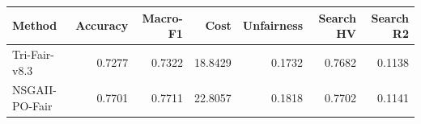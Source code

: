 \begin{tabular}{lrrrrrr}
\hline
Method & Accuracy & Macro-F1 & Cost & Unfairness & Search HV & Search R2 \\
\hline
Tri-Fair-v8.3 & 0.7277 & 0.7322 & 18.8429 & 0.1732 & 0.7682 & 0.1138 \\
NSGAII-PO-Fair & 0.7701 & 0.7711 & 22.8057 & 0.1818 & 0.7702 & 0.1141 \\
\hline
\end{tabular}